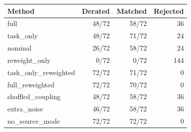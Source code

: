 \begin{center}\small
\begin{tabular}{lrrr}
\toprule
Method & Derated & Matched & Rejected \\
\midrule
full & 48/72 & 58/72 & 36\\
task\_only & 48/72 & 71/72 & 24\\
nominal & 26/72 & 58/72 & 24\\
reweight\_only & 0/72 & 0/72 & 144\\
task\_only\_reweighted & 72/72 & 71/72 & 0\\
full\_reweighted & 72/72 & 70/72 & 0\\
shuffled\_coupling & 48/72 & 58/72 & 36\\
extra\_noise & 46/72 & 58/72 & 36\\
no\_source\_mode & 72/72 & 72/72 & 0\\
\bottomrule
\end{tabular}
\end{center}

